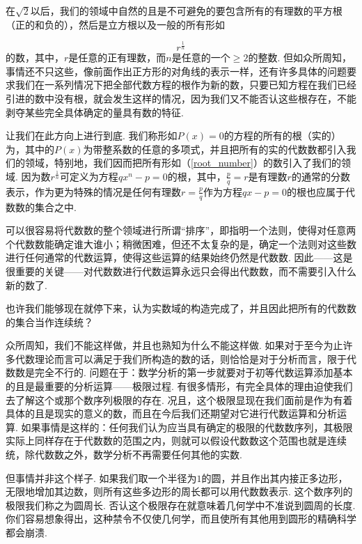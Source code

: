 \documentclass[color=cyan,mathpazo,titlestyle=hang]{elegantbook_mac}
\begin{document}
在$\sqrt{2}$以后，我们的领域中自然的且是不可避免的要包含所有的有理数的平方根（正的和负的），然后是立方根以及一般的所有形如

\begin{equation}
r^\frac{1}{n}
\label{root_number}
\end{equation}
的数，其中，$r$是任意的正有理数，而$n$是任意的一个$\geqslant 2$的整数. 但如众所周知，事情还不只这些，像前面作出正方形的对角线的表示一样，还有许多具体的问题要求我们在一系列情况下把全部代数方程的根作为新的数，只要已知方程在我们已经引进的数中没有根，就会发生这样的情况，因为我们又不能否认这些根存在，不能剥夺某些完全具体确定的量具有数的特征.

让我们在此方向上进行到底. 我们称形如$P(x)=0$的方程的所有的根（实的）为，其中的$P(x)$为带整系数的任意的多项式，并且把所有的实的代数数都引入我们的领域，特别地，我们因而把所有形如（\ref{root_number}）的数引入了我们的领域. 因为数$r^\frac{1}{n}$可定义为方程$qx^n-p=0$的根，其中，$\frac{p}{q}=r$是有理数$r$的通常的分数表示，作为更为特殊的情况是任何有理数$r=\frac{p}{q}$作为方程$qx-p=0$的根也应属于代数数的集合之中.

可以很容易将代数数的整个领域进行所谓``排序''，即指明一个法则，使得对任意两个代数数能确定谁大谁小；稍微困难，但还不太复杂的是，确定一个法则对这些数进行任何通常的代数运算，使得这些运算的结果始终仍然是代数数. 因此——这是很重要的关键——对代数数进行代数运算永远只会得出代数数，而不需要引入什么新的数了. 

也许我们能够现在就停下来，认为实数域的构造完成了，并且因此把所有的代数数的集合当作连续统？

众所周知，我们不能这样做，并且也熟知为什么不能这样做. 如果对于至今为止许多代数理论而言可以满足于我们所构造的数的话，则恰恰是对于分析而言，限于代数数是完全不行的. 问题在于：数学分析的第一步就要对于初等代数运算添加基本的且是最重要的分析运算——极限过程. 有很多情形，有完全具体的理由迫使我们去了解这个或那个数序列极限的存在. 况且，这个极限显现在我们面前是作为有着具体的且是现实的意义的数，而且在今后我们还期望对它进行代数运算和分析运算. 如果事情是这样的：任何我们认为应当具有确定的极限的代数数序列，其极限实际上同样存在于代数数的范围之内，则就可以假设代数数这个范围也就是连续统，除代数数之外，数学分析不再需要任何其他的实数. 

但事情并非这个样子. 如果我们取一个半径为$1$的圆，并且作出其内接正多边形，无限地增加其边数，则所有这些多边形的周长都可以用代数数表示. 这个数序列的极限我们称之为圆周长. 否认这个极限存在就意味着几何学中不准说到圆周的长度. 你们容易想象得出，这种禁令不仅使几何学，而且使所有其他用到圆形的精确科学都会崩溃. 
\end{document}
